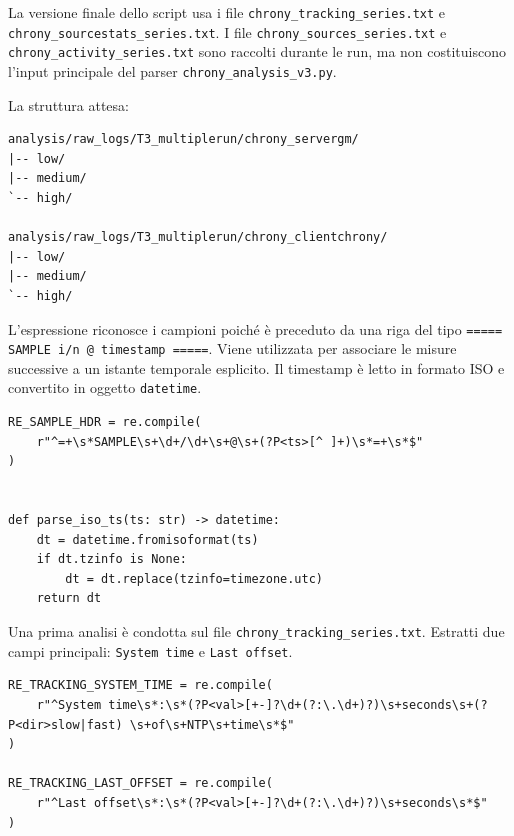 \begin{sloppypar}
  La versione finale dello script usa i file \texttt{chrony\_tracking\_series.txt} e
  \texttt{chrony\_sourcestats\_series.txt}. I file
  \texttt{chrony\_sources\_series.txt} e \texttt{chrony\_activity\_series.txt}
  sono raccolti durante le run, ma non costituiscono l'input principale del parser
  \texttt{chrony\_analysis\_v3.py}.
\end{sloppypar}

La struttura attesa:

\begin{listing}[H]
\begin{verbatim}
analysis/raw_logs/T3_multiplerun/chrony_servergm/
|-- low/
|-- medium/
`-- high/

analysis/raw_logs/T3_multiplerun/chrony_clientchrony/
|-- low/
|-- medium/
`-- high/
\end{verbatim}
\caption{Struttura di input utilizzata dal parser Chrony.}
\label{lst:chrony-input-structure}
\end{listing}

L'espressione riconosce i campioni poiché è preceduto da una riga del tipo
\texttt{===== SAMPLE i/n @ timestamp =====}. Viene utilizzata per
associare le misure successive a un istante temporale esplicito. Il timestamp è
letto in formato ISO e convertito in oggetto \texttt{datetime}.

\begin{listing}[H]
\begin{verbatim}
RE_SAMPLE_HDR = re.compile(
    r"^=+\s*SAMPLE\s+\d+/\d+\s+@\s+(?P<ts>[^ ]+)\s*=+\s*$"
)


def parse_iso_ts(ts: str) -> datetime:
    dt = datetime.fromisoformat(ts)
    if dt.tzinfo is None:
        dt = dt.replace(tzinfo=timezone.utc)
    return dt
\end{verbatim}
\caption{Riconoscimento dell'intestazione dei campioni Chrony.}
\label{lst:chrony-sample-header}
\end{listing}

Una prima analisi è condotta sul file \texttt{chrony\_tracking\_series.txt}. 
Estratti due campi principali: \texttt{System time} e \texttt{Last offset}.

\begin{listing}[H]
\begin{verbatim}
RE_TRACKING_SYSTEM_TIME = re.compile(
    r"^System time\s*:\s*(?P<val>[+-]?\d+(?:\.\d+)?)\s+seconds\s+(?P<dir>slow|fast) \s+of\s+NTP\s+time\s*$"
)

RE_TRACKING_LAST_OFFSET = re.compile(
    r"^Last offset\s*:\s*(?P<val>[+-]?\d+(?:\.\d+)?)\s+seconds\s*$"
)
\end{verbatim}
\caption{Pattern utilizzati per estrarre le metriche di tracking Chrony.}
\label{lst:chrony-regex-tracking}
\end{listing}

